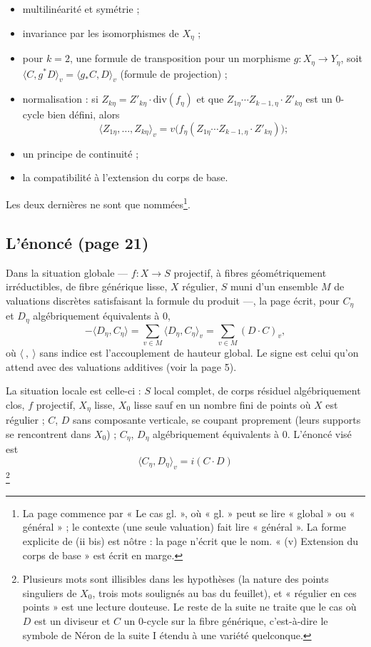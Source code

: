 \documentclass[11pt,a4paper]{article}
\begin{document}
\begin{itemize}
  \item[(i)] multilinéarité et symétrie ;
  \item[(ii)] invariance par les isomorphismes de $X_\eta$ ;
  \item[(ii bis)] pour $k = 2$, une formule de transposition pour un morphisme
  $g : X_\eta \to Y_\eta$, soit
  $\langle C, g^*D\rangle_v = \langle g_*C, D\rangle_v$ (formule de
  projection) ;
  \item[(iii)] normalisation : si $Z_{k\eta} = Z'_{k\eta} \cdot
  \mathrm{div}(f_\eta)$ et que $Z_{1\eta} \cdots Z_{k-1,\eta} \cdot
  Z'_{k\eta}$ est un $0$-cycle bien défini, alors
  \[
    \langle Z_{1\eta}, \ldots, Z_{k\eta}\rangle_v =
    v\bigl(f_\eta(Z_{1\eta} \cdots Z_{k-1,\eta} \cdot Z'_{k\eta})\bigr) ;
  \]
  \item[(iv)] un principe de continuité ;
  \item[(v)] la compatibilité à l'extension du corps de base.
\end{itemize}

Les deux dernières ne sont que nommées\footnote{La page commence par
« Le cas gl. », où « gl. » peut se lire « global » ou « général » ; le
contexte (une seule valuation) fait lire « général ». La forme explicite
de (ii bis) est nôtre : la page n'écrit que le nom. « (v) Extension du corps
de base » est écrit en marge.}.

\subsection*{L'énoncé (page 21)}

Dans la situation globale — $f : X \to S$ projectif, à fibres
géométriquement irréductibles, de fibre générique lisse, $X$ régulier, $S$
muni d'un ensemble $M$ de valuations discrètes satisfaisant la formule du
produit —, la page écrit, pour $C_\eta$ et $D_\eta$ algébriquement
équivalents à $0$,
\[
  -\langle D_\eta, C_\eta\rangle = \sum_{v \in M} \langle D_\eta,
  C_\eta\rangle_v = \sum_{v \in M} (D \cdot C)_v,
\]
où $\langle\ ,\ \rangle$ sans indice est l'accouplement de hauteur global.
Le signe est celui qu'on attend avec des valuations additives (voir la
page 5).

La situation locale est celle-ci : $S$ local complet, de corps résiduel
algébriquement clos, $f$ projectif, $X_\eta$ lisse, $X_0$ lisse sauf en un
nombre fini de points où $X$ est régulier ; $C$, $D$ sans composante
verticale, se coupant proprement (leurs supports se rencontrent dans
$X_0$) ; $C_\eta$, $D_\eta$ algébriquement équivalents à $0$. L'énoncé
visé est
\[
  \boxed{\ \langle C_\eta, D_\eta\rangle_v = i(C \cdot D)\ }
\]
\footnote{Plusieurs mots sont illisibles dans les hypothèses (la nature des
points singuliers de $X_0$, trois mots soulignés au bas du feuillet), et
« régulier en ces points » est une lecture douteuse. Le reste de la suite
ne traite que le cas où $D$ est un diviseur et $C$ un $0$-cycle sur la
fibre générique, c'est-à-dire le symbole de Néron de la suite I étendu à
une variété quelconque.}
\end{document}
